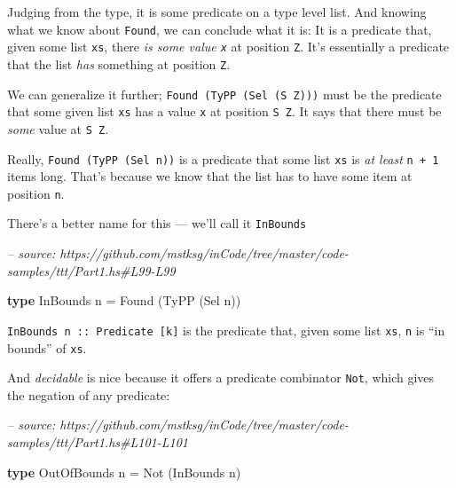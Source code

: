 \documentclass[]{article}
\newenvironment{Shaded}{}{}
\newcommand{\CommentTok}[1]{\textcolor[rgb]{0.38,0.63,0.69}{\textit{#1}}}
\newcommand{\DataTypeTok}[1]{\textcolor[rgb]{0.56,0.13,0.00}{#1}}
\newcommand{\FunctionTok}[1]{\textcolor[rgb]{0.02,0.16,0.49}{#1}}
\newcommand{\KeywordTok}[1]{\textcolor[rgb]{0.00,0.44,0.13}{\textbf{#1}}}
\newcommand{\NormalTok}[1]{#1}
\begin{document}
Judging from the type, it is some predicate on a type level list. And knowing
what we know about \texttt{Found}, we can conclude what it is: It is a predicate
that, given some list \texttt{xs}, there \emph{is some value \texttt{x}} at
position \texttt{\textquotesingle{}Z}. It's essentially a predicate that the
list \emph{has} something at position \texttt{\textquotesingle{}Z}.

We can generalize it further;
\texttt{Found\ (TyPP\ (Sel\ (\textquotesingle{}S\ \textquotesingle{}Z)))} must
be the predicate that some given list \texttt{xs} has a value \texttt{x} at
position \texttt{\textquotesingle{}S\ \textquotesingle{}Z}. It says that there
must be \emph{some} value at \texttt{\textquotesingle{}S\ \textquotesingle{}Z}.

Really, \texttt{Found\ (TyPP\ (Sel\ n))} is a predicate that some list
\texttt{xs} is \emph{at least} \texttt{n\ +\ 1} items long. That's because we
know that the list has to have some item at position \texttt{n}.

There's a better name for this --- we'll call it \texttt{InBounds}

\begin{Shaded}
\begin{Highlighting}[]
\CommentTok{-- source: https://github.com/mstksg/inCode/tree/master/code-samples/ttt/Part1.hs#L99-L99}

\KeywordTok{type} \DataTypeTok{InBounds}\NormalTok{    n }\FunctionTok{=} \DataTypeTok{Found}\NormalTok{ (}\DataTypeTok{TyPP}\NormalTok{ (}\DataTypeTok{Sel}\NormalTok{ n))}
\end{Highlighting}
\end{Shaded}

\texttt{InBounds\ n\ ::\ Predicate\ {[}k{]}} is the predicate that, given some
list \texttt{xs}, \texttt{n} is ``in bounds'' of \texttt{xs}.

And \emph{decidable} is nice because it offers a predicate combinator
\texttt{Not}, which gives the negation of any predicate:

\begin{Shaded}
\begin{Highlighting}[]
\CommentTok{-- source: https://github.com/mstksg/inCode/tree/master/code-samples/ttt/Part1.hs#L101-L101}

\KeywordTok{type} \DataTypeTok{OutOfBounds}\NormalTok{ n }\FunctionTok{=} \DataTypeTok{Not}\NormalTok{ (}\DataTypeTok{InBounds}\NormalTok{ n)}
\end{Highlighting}
\end{Shaded}
\end{document}
